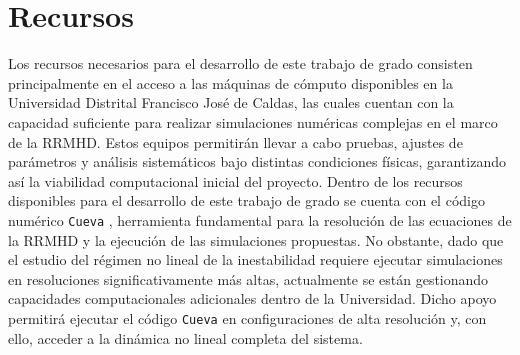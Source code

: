 \section{Recursos}
\noindent  Los recursos necesarios para el desarrollo de este trabajo de grado consisten principalmente en el acceso a las máquinas de cómputo disponibles en la Universidad Distrital Francisco José de Caldas, las cuales cuentan con la capacidad suficiente para realizar simulaciones numéricas complejas en el marco de la RRMHD. Estos equipos permitirán llevar a cabo pruebas, ajustes de parámetros y análisis sistemáticos bajo distintas condiciones físicas, garantizando así la viabilidad computacional inicial del proyecto. Dentro de los recursos disponibles para el desarrollo de este trabajo de grado se cuenta con el código numérico \texttt{Cueva} \citep{aranguren-2013}, herramienta fundamental para la resolución de las ecuaciones de la RRMHD y la ejecución de las simulaciones propuestas. No obstante, dado que el estudio del régimen no lineal de la inestabilidad requiere ejecutar simulaciones en resoluciones significativamente más altas, actualmente se están gestionando capacidades computacionales adicionales dentro de la Universidad. Dicho apoyo permitirá ejecutar el código \texttt{Cueva} en configuraciones de alta resolución y, con ello, acceder a la dinámica no lineal completa del sistema.
